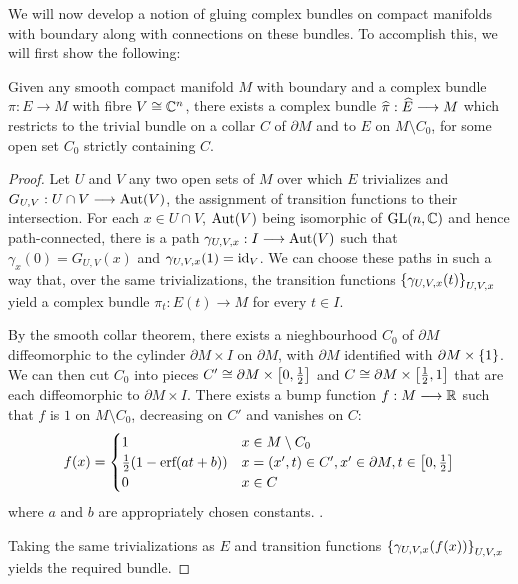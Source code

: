 \documentclass[./Thick_TQFTs_and_Quantum_Information.tex]{subfiles}
\begin{document}
We will now develop a notion of gluing complex bundles on compact manifolds with
boundary along with connections on these bundles. To accomplish this, we will
first show the following:
\begin{thm}\label{thm:gluing}
Given any smooth compact manifold $M$ with boundary and a complex bundle
$\pi : E \to M$ with fibre $V \cong \mathbb{C}^n$, there exists a complex bundle
$\widehat{\pi} : \widehat{E} \stackrel{}{\longrightarrow} M$ which restricts to the trivial bundle on a collar $C$
of $\partial M$ and to $E$ on $M \setminus C_0$, for some open set $C_0$
strictly containing $C$.
\end{thm}
\begin{proof}
Let $U$ and $V$ any two open sets of $M$ over which $E$ trivializes and
$G_{U, V} : U \cap V \stackrel{}{\longrightarrow} \text{Aut}(V)$, the assignment of transition functions to
their intersection. For each $x \in U \cap V$, $\text{Aut}(V)$ being isomorphic of
$\text{GL}(n, \mathbb{C})$ and hence path-connected, there is a path
$\gamma_{U, V, x} : I \stackrel{}{\longrightarrow} \text{Aut}(V)$ such that $\gamma_{x}(0) = G_{U, V}(x)$ and
$\gamma_{U, V, x}(1) = \text{id}_V$. We can choose these paths in such a way that,
over the same trivializations, the transition functions
$\set{\gamma_{U, V, x}(t)}_{U, V, x}$ yield a complex bundle
$\pi_t : E(t) \to M$ for every $t \in I$.

By the smooth collar theorem, there exists a nieghbourhood $C_0$ of $\partial M$
diffeomorphic to the cylinder $\partial M \times I$ on $\partial M$,
with $\partial M$ identified with $\partial M \times \set{1}$.
We can then cut $C_0$ into pieces
$C' \cong \partial M \times \left[ 0, \frac{1}{2} \right]$ and
$C \cong \partial M \times \left[ \frac{1}{2}, 1 \right]$ that are each diffeomorphic to
$\partial M \times I$. There exists a bump function $f : M \stackrel{}{\longrightarrow} \mathbb{R}$ such that
$f$ is $1$ on $M \setminus C_0$, decreasing on $C'$ and vanishes on $C$:
\[
  f(x) = \begin{cases}
    1 & x \in M \setminus C_0 \\
    \frac{1}{2}(1 - \text{erf}(at + b))
      & x = (x', t) \in C', x' \in \partial M, t \in \left[ 0, \frac{1}{2} \right] \\
    0 & x \in C
  \end{cases}
\]
where $a$ and $b$ are appropriately chosen constants.
.

Taking the same trivializations as $E$ and transition functions
$\set{\gamma_{U, V, x}(f(x))}_{U, V, x}$ yields the required bundle.
\end{proof}
\end{document}
